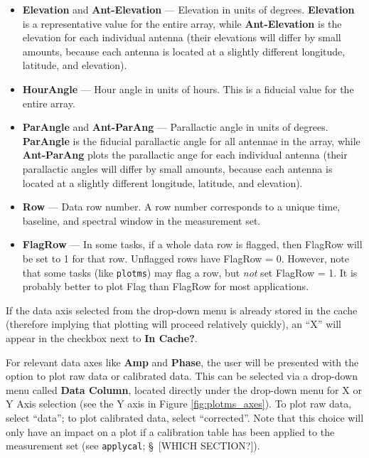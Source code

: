 \begin{itemize}
\item {\bf Elevation} and {\bf Ant-Elevation} --- Elevation in units of degrees. {\bf Elevation} is a representative value for the entire array, while {\bf Ant-Elevation} is the elevation for each individual antenna (their elevations will differ by small amounts, because each antenna is located at a slightly different longitude, latitude, and elevation).

\item {\bf HourAngle} --- Hour angle in units of hours. This is a fiducial value for the entire array.

\item {\bf ParAngle} and {\bf Ant-ParAng} --- Parallactic angle in units of degrees. {\bf ParAngle} is the fiducial parallactic angle for all antennae in the array, while {\bf Ant-ParAng} plots the parallactic ange for each individual antenna (their parallactic angles will differ by small amounts, because each antenna is located at a slightly different longitude, latitude, and elevation).

\item {\bf Row} --- Data row number. A row number corresponds to a unique time, baseline, and spectral window in the measurement set.

\item {\bf FlagRow} --- In some tasks, if a whole data row is flagged, then FlagRow will be set to 1 for that row. Unflagged rows have FlagRow = 0. However, note that some tasks (like {\tt plotms}) may flag a row, but {\it not} set FlagRow = 1. It is probably better to plot Flag than FlagRow for most applications.
\end{itemize}

If the data axis selected from the drop-down menu is already stored in the cache (therefore implying that plotting will proceed relatively quickly), an ``X'' will appear in the checkbox next to {\bf In Cache?}.

For relevant data axes like {\bf Amp} and {\bf Phase}, the user will be presented with the option to plot raw data or calibrated data. This can be selected via a drop-down menu called {\bf Data Column}, located directly under the drop-down menu for X or Y Axis selection (see the Y axis in Figure \ref{fig:plotms_axes}). To plot raw data, select ``data''; to plot calibrated data, select ``corrected''. Note that this choice will only have an impact on a plot if a calibration table has been applied to the measurement set (see {\tt applycal}; \S~[WHICH SECTION?]). 

